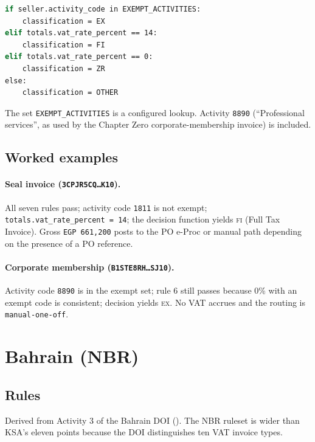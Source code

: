 \documentclass[11pt,a4paper,twoside]{report}
\newcommand{\corpus}{}
\begin{document}
\begin{lstlisting}[language=bash,basicstyle=\ttfamily\small]
if seller.activity_code in EXEMPT_ACTIVITIES:
    classification = EX
elif totals.vat_rate_percent == 14:
    classification = FI
elif totals.vat_rate_percent == 0:
    classification = ZR
else:
    classification = OTHER
\end{lstlisting}
The set \texttt{EXEMPT\_ACTIVITIES} is a configured lookup. Activity
\texttt{8890} (``Professional services'', as used by the Chapter Zero
corporate-membership invoice) is included.

\subsection{Worked examples}

\paragraph{Seal invoice (\texttt{3CPJR5CQ\ldots K10}).}
All seven rules pass; activity code \texttt{1811} is not exempt;
\texttt{totals.vat\_rate\_percent~=~14}; the decision function yields
\textsc{fi} (Full Tax Invoice). Gross \texttt{EGP~661{,}200} posts to
the PO e-Proc or manual path depending on the presence of a PO
reference.

\paragraph{Corporate membership (\texttt{B1STE8RH\ldots SJ10}).}
Activity code \texttt{8890} is in the exempt set; rule 6 still passes
because 0\% with an exempt code is consistent; decision yields \textsc{ex}.
No VAT accrues and the routing is \texttt{manual-one-off}.

\section{Bahrain (NBR)}

\subsection{Rules}

Derived from Activity 3 of the Bahrain DOI
(\corpus{}). The
NBR ruleset is wider than KSA's eleven points because the DOI
distinguishes ten VAT invoice types.
\end{document}
